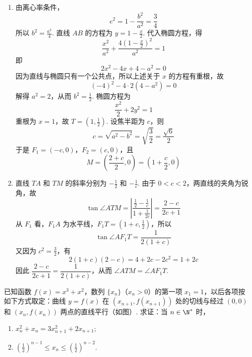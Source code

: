 \begin{solution}
\begin{enumerate}
\item
由离心率条件，
\[
e^2=1-\frac{b^2}{a^2}=\frac34
\]
所以 \(b^2=\frac{a^2}{4}\). 直线 \(AB\) 的方程为 \(y=1-\frac x2\). 代入椭圆方程，得
\[
\frac{x^2}{a^2}+\frac{4\left(1-\frac x2\right)^2}{a^2}=1
\]
即
\[
2x^2-4x+4-a^2=0
\]
因为直线与椭圆只有一个公共点，所以上述关于 \(x\) 的方程有重根，故
\[
(-4)^2-4\cdot2(4-a^2)=0
\]
解得 \(a^2=2\)，从而 \(b^2=\frac12\). 椭圆方程为
\[
\frac{x^2}{2}+2y^2=1
\]
重根为 \(x=1\)，故 \(T=(1,\frac12)\). 设焦半距为 \(c\)，则
\[
c=\sqrt{a^2-b^2}=\sqrt{\frac32}=\frac{\sqrt6}{2}
\]
于是 \(F_1=(-c,0)\)，\(F_2=(c,0)\)，且
\[
M=\left(\frac{2+c}{2},0\right)=\left(1+\frac c2,0\right)
\]

\item
直线 \(TA\) 和 \(TM\) 的斜率分别为 \(-\frac12\) 和 \(-\frac1c\). 由于 \(0<c<2\)，两直线的夹角为锐角，故
\[
\tan\angle ATM=\left|\frac{\frac12-\frac1c}{1+\frac1{2c}}\right|=\frac{2-c}{2c+1}
\]
从 \(F_1\) 看，\(F_1A\) 为水平线，\(F_1T=(1+c,\frac12)\)，所以
\[
\tan\angle AF_1T=\frac1{2(1+c)}
\]
又因为 \(c^2=\frac32\)，有
\[
2(1+c)(2-c)=4+2c-2c^2=1+2c
\]
因此 \(\dfrac{2-c}{2c+1}=\dfrac1{2(1+c)}\)，从而 \(\angle ATM=\angle AF_1T\).
\end{enumerate}
\end{solution}

\begin{problem}
已知函数 \( f(x) = x^3 + x^2 \)，数列 \( \{x_n\} \)（\(x_n > 0\)）的第一项 \( x_1 = 1 \)，以后各项按如下方式取定：曲线 \( y = f(x) \) 在 \((x_{n+1}, f(x_{n+1}))\) 处的切线与经过 \((0,0)\) 和 \((x_n, f(x_n))\) 两点的直线平行（如图）. 求证：当 \(n\in\N^*\) 时，

\begin{enumerate}
\item \(x_{n}^{2} + x_{n} = 3x_{n + 1}^{2} + 2x_{n + 1};\)
\item \(\left(\frac{1}{2}\right)^{n - 1}\leqslant x_n\leqslant \left(\frac{1}{2}\right)^{n - 2}\).
\end{enumerate}

\end{problem}

